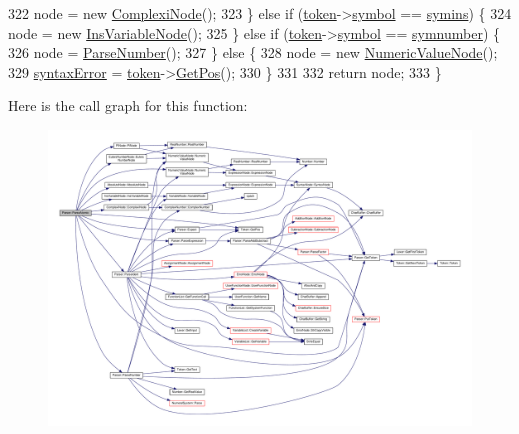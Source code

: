 \begin{DoxyCode}
322         node = \textcolor{keyword}{new} \hyperlink{classComplexiNode}{ComplexiNode}();
323     \} \textcolor{keywordflow}{else} \textcolor{keywordflow}{if} (\hyperlink{classParser_a467028559d31c5b33f16ca8be56715cc}{token}->\hyperlink{structToken_aa671eaaae5632c5277e89a090d864820}{symbol} == \hyperlink{lex_8h_a7feef761cd73fac6e25b8bb80d2c4e54a9d73d7f91bede76e486cd94f75675faf}{symins}) \{
324         node = \textcolor{keyword}{new} \hyperlink{classInsVariableNode}{InsVariableNode}();
325     \} \textcolor{keywordflow}{else} \textcolor{keywordflow}{if} (\hyperlink{classParser_a467028559d31c5b33f16ca8be56715cc}{token}->\hyperlink{structToken_aa671eaaae5632c5277e89a090d864820}{symbol} == \hyperlink{lex_8h_a7feef761cd73fac6e25b8bb80d2c4e54add691c5ad44197e2c9e9dab9793450a2}{symnumber}) \{
326         node = \hyperlink{classParser_a769d580b14d3d097ed255ad869cc1653}{ParseNumber}();
327     \} \textcolor{keywordflow}{else} \{
328         node = \textcolor{keyword}{new} \hyperlink{classNumericValueNode}{NumericValueNode}();
329         \hyperlink{classParser_ae50a199b804c9f5e8342a4d0a1ae6a95}{syntaxError} = \hyperlink{classParser_a467028559d31c5b33f16ca8be56715cc}{token}->\hyperlink{structToken_a5f93ea94940a6eeb060507e1da594599}{GetPos}();
330     \}
331 
332     \textcolor{keywordflow}{return} node;
333 \}
\end{DoxyCode}


Here is the call graph for this function\+:\nopagebreak
\begin{figure}[H]
\begin{center}
\leavevmode
\includegraphics[width=350pt]{classParser_ac1a69267c9414b54a4b592c9ad084780_cgraph}
\end{center}
\end{figure}




